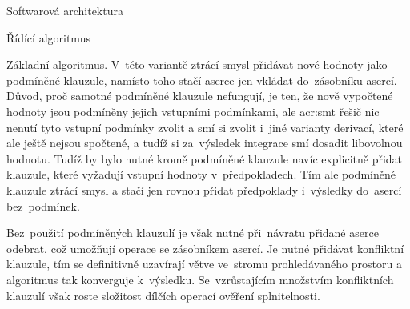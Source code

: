 \documentclass[thesis=M,czech]{FITthesis}[2012/06/26]
\newcommand{\acrlabel}[1]{acr:#1}
\newcommand{\acr}[1]{\acrshort{\acrlabel{#1}}}
\begin{document}
\begin{section}{Softwarová architektura}
\begin{subsection}{Řídící algoritmus}
\begin{paragraph}{Základní algoritmus.}
V~této variantě ztrácí smysl přidávat
nové hodnoty jako podmíněné klauzule,
namísto toho stačí aserce jen vkládat do~zásobníku asercí.
Důvod, proč samotné podmíněné klauzule nefungují,
je ten, že nově vypočtené hodnoty
jsou podmíněny jejich vstupními podmínkami,
ale \acr{smt} řešič nic nenutí tyto vstupní podmínky zvolit
a smí si zvolit i~jiné varianty derivací,
které ale ještě nejsou spočtené,
a tudíž si za~výsledek integrace smí dosadit libovolnou hodnotu.
Tudíž by bylo nutné kromě podmíněné klauzule
navíc explicitně přidat klauzule,
které vyžadují vstupní hodnoty v~předpokladech.
Tím ale podmíněné klauzule ztrácí smysl
a stačí jen rovnou přidat předpoklady
i~výsledky do~asercí bez~podmínek.

Bez~použití podmíněných klauzulí
je však nutné při~návratu
přidané aserce odebrat,
což umožňují operace se zásobníkem asercí.
Je nutné přidávat konfliktní klauzule,
tím se definitivně uzavírají větve
ve~stromu prohledávaného prostoru
a algoritmus tak konverguje k~výsledku.
Se~vzrůstajícím množstvím konfliktních klauzulí
však roste složitost dílčích operací ověření splnitelnosti.


\end{paragraph}
\end{subsection}
\end{section}
\end{document}

